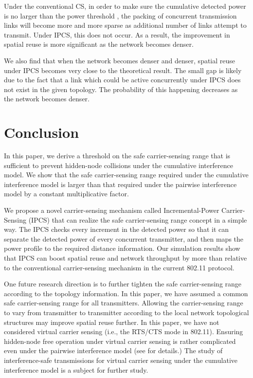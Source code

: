 \documentclass[conference]{IEEEtran}
\begin{document}
Under the conventional CS, in order to make sure the cumulative
detected power is no larger than the power threshold , the
packing of concurrent transmission links will become more and more
sparse as additional number of links attempt to transmit. Under
IPCS, this does not occur. As a result, the improvement in spatial
reuse is more signif\/icant as the network becomes denser.

We also f\/ind that when the network becomes denser and denser,
spatial reuse under IPCS becomes very close to the theoretical
result. The small gap is likely due to the fact that a link which
could be active concurrently under IPCS does not exist in the given
topology. The probability of this happening decreases as the network
becomes denser.











\section{Conclusion}\label{conclusion}

In this paper, we derive a threshold on the safe carrier-sensing
range that is suff\/icient to prevent hidden-node collisions under
the cumulative interference model. We show that the safe
carrier-sensing range required under the cumulative interference
model is larger than that required under the pairwise interference
model by a constant multiplicative factor.

We propose a novel carrier-sensing mechanism called
Incremental-Power Carrier-Sensing (IPCS) that can realize the safe
carrier-sensing range concept in a simple way. The IPCS checks every
increment in the detected power so that it can separate the detected
power of every concurrent transmitter, and then maps the power
prof\/ile to the required distance information. Our simulation
results show that IPCS can boost spatial reuse and network
throughput by more than  relative to the conventional
carrier-sensing mechanism in the current 802.11 protocol.

One future research direction is to further tighten the safe
carrier-sensing range according to the topology information. In this
paper, we have assumed a common safe carrier-sensing range for all
transmitters. Allowing the carrier-sensing range to vary from
transmitter to transmitter according to the local network
topological structures may improve spatial reuse further. In this
paper, we have not considered virtual carrier sensing (i.e., the
RTS/CTS mode in 802.11). Ensuring hidden-node free operation under
virtual carrier sensing is rather complicated even under the
pairwise interference model (see \cite{libinhdfvcs} for details.)
The study of interference-safe transmissions for virtual carrier
sensing under the cumulative interference model is a subject for
further study.
\end{document}
